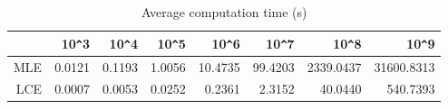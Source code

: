 \begin{table}[ht]
\centering
\begin{tabular}{rrrrrrrr}
  \hline
 & 10\verb|^|3 & 10\verb|^|4 & 10\verb|^|5 & 10\verb|^|6 & 10\verb|^|7 & 10\verb|^|8 & 10\verb|^|9 \\ 
  \hline
MLE & 0.0121 & 0.1193 & 1.0056 & 10.4735 & 99.4203 & 2339.0437 & 31600.8313 \\ 
  LCE & 0.0007 & 0.0053 & 0.0252 & 0.2361 & 2.3152 & 40.0440 & 540.7393 \\ 
   \hline
\end{tabular}
\caption{Average computation time (s)} 
\label{tab:gamma:time:varying:size}
\end{table}
